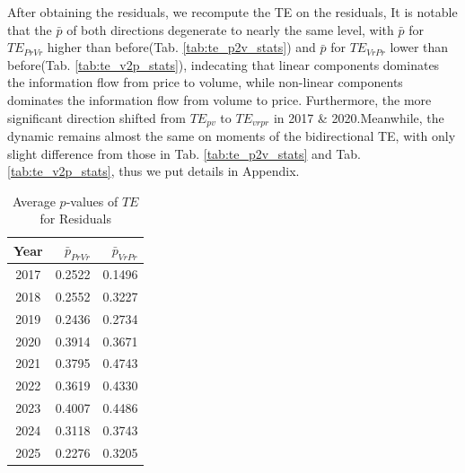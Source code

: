 \documentclass{elsarticle}
\def\rightarrow{}%
\begin{document}
After obtaining the residuals, we recompute the TE on the residuals, It is notable that the $\bar{p}$ of both directions degenerate to nearly the same level, with $\bar{p}$ for $TE_{Pr \rightarrow Vr}$ higher than before(Tab. \ref{tab:te_p2v_stats}) and $\bar{p}$ for $TE_{Vr \rightarrow Pr}$ lower than before(Tab. \ref{tab:te_v2p_stats}), indecating that linear components dominates the information flow from price to volume, while non-linear components dominates the information flow from volume to price. Furthermore, the more significant direction shifted from $TE_{p \rightarrow v}$ to $TE_{vr \rightarrow pr}$ in 2017 \& 2020.Meanwhile, the dynamic remains almost the same on moments of the bidirectional TE, with only slight difference from those in Tab. \ref{tab:te_p2v_stats} and Tab. \ref{tab:te_v2p_stats}, thus we put details in Appendix. 
\begin{table}[H]
  \caption{Average $p$‑values of $TE$ for Residuals}
  \label{tab:ter_residual_pvalues}
  \centering
  \begin{tabular}{crr}
    \hline\noalign{\smallskip}
    \textbf{Year} & $\bar{p}_{Pr \rightarrow Vr}$ & $\bar{p}_{Vr \rightarrow Pr}$ \\
    \hline\noalign{\smallskip}
    2017 & 0.2522 & 0.1496 \\
    2018 & 0.2552 & 0.3227 \\
    2019 & 0.2436 & 0.2734 \\
    2020 & 0.3914 & 0.3671 \\
    2021 & 0.3795 & 0.4743 \\
    2022 & 0.3619 & 0.4330 \\
    2023 & 0.4007 & 0.4486 \\
    2024 & 0.3118 & 0.3743 \\
    2025 & 0.2276 & 0.3205 \\
    \hline
  \end{tabular}
\end{table}
\end{document}
